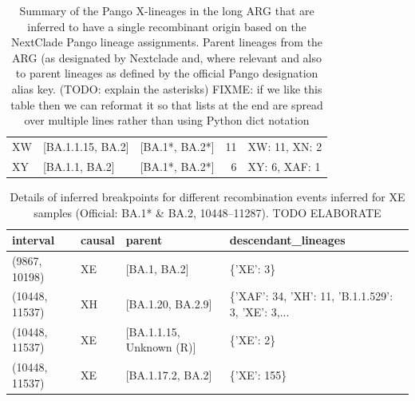 \documentclass{article}
\begin{document}
\begin{table}
\begin{tabular}{lllrl}
XW      &            [BA.1.1.15, BA.2] &         [BA.1*, BA.2*] &  11 & XW: 11, XN: 2 \\
XY      &               [BA.1.1, BA.2] &         [BA.1*, BA.2*] &   6 & XY: 6, XAF: 1 \\
\bottomrule
\end{tabular}
\caption{\label{tab:pango-single-origin}
Summary of the Pango X-lineages in the long ARG that are inferred to have a
single recombinant origin based on the NextClade Pango lineage assignments.
Parent lineages from the ARG (as designated by Nextclade and, where relevant
and also to parent lineages as defined by the official Pango designation alias
key. (TODO: explain the asterisks) FIXME: if we like this table then we can
reformat it so that lists at the end are spread over multiple lines rather than
using Python dict notation }
\end{table}

\begin{table}
\begin{tabular}{llll}
\toprule
 interval &                 causal & parent &                                descendant\_lineages \\
\midrule
 (9867, 10198) &             XE  & [BA.1, BA.2] &                                          \{'XE': 3\} \\
(10448, 11537) &             XH  & [BA.1.20, BA.2.9] &  \{'XAF': 34, 'XH': 11, 'B.1.1.529': 3, 'XE': 3,... \\
(10448, 11537) &             XE  & [BA.1.1.15, Unknown (R)] & \{'XE': 2\} \\
(10448, 11537) &             XE  & [BA.1.17.2, BA.2] &                                        \{'XE': 155\} \\
\bottomrule
\end{tabular}
\caption{\label{tab:multiple_origins_table}
Details of inferred
breakpoints for different recombination events inferred for XE samples
(Official: BA.1* \& BA.2, 10448–11287). TODO ELABORATE}
\end{table}
\end{document}
